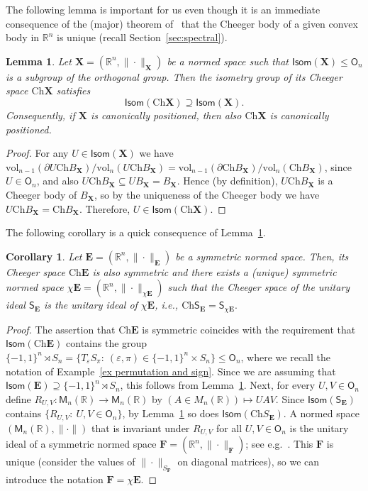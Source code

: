 \documentclass[11pt,reqno]{amsart}
\renewcommand{\le}{\leqslant}
\newcommand{\X}{\mathbf X}
\newcommand{\e}{\varepsilon}
\newcommand{\R}{\mathbb R}
\newtheorem{lemma}[theorem]{Lemma}
\newtheorem{corollary}[theorem]{Corollary}
\theoremstyle{remark}
\newcommand{\M}{\mathsf{M}}
\renewcommand{\supset}{\supseteq}
\newcommand{\sfS}{\mathsf{S}}
\renewcommand{\subset}{\subseteq}
\newcommand{\Ch}{\mathrm{Ch}}
\newcommand{\vol}{\mathrm{vol}}
\renewcommand{\1}{\mathbf 1}
\newcommand{\bfE}{\mathbf{E}}
\newcommand{\bfF}{\mathbf{F}}
\begin{document}
The following lemma is important for us even though it is an immediate consequence of the (major) theorem of~\cite{AC09} that  the Cheeger body of a given convex body in $\R^n$ is unique (recall Section~\ref{sec:spectral}).

\begin{lemma}\label{lem:cheeger uniqueness} Let $\X=(\R^n,\|\cdot\|_\X)$ be a normed space such that $\mathsf{Isom}(\X)\le \mathsf{O}_n$ is a subgroup of the orthogonal group. Then the isometry group of its Cheeger space $\Ch\X$ satisfies
$$
\mathsf{Isom}(\Ch\X)\supset \mathsf{Isom}(\X).
$$
Consequently, if $\X$ is canonically positioned, then also $\Ch\X$ is canonically positioned.
\end{lemma}

\begin{proof} For any $U\in \mathsf{Isom}(\X)$ we have  $\vol_{n-1}(\partial U\Ch B_\X)/\vol_n(U\Ch B_\X)= \vol_{n-1}(\partial \Ch B_\X)/\vol_n(\Ch B_\X)$, since $U\in \mathsf{O}_n$, and also $U\Ch B_\X\subset U B_\X= B_\X$. Hence (by definition), $U\Ch B_\X$ is a Cheeger body of $B_\X$, so by the uniqueness of the Cheeger body we have $U\Ch B_\X=\Ch B_\X$. Therefore, $U\in \mathsf{Isom}(\Ch \X)$.
\end{proof}

The following corollary is a quick consequence of Lemma~\ref{lem:cheeger uniqueness}.

\begin{corollary}\label{cor chi space} Let $\bfE=(\R^n,\|\cdot\|_\bfE)$ be a symmetric normed space. Then, its Cheeger space $\Ch \bfE$ is also symmetric and  there exists a (unique) symmetric normed space $\chi\bfE=(\R^n,\|\cdot\|_{\chi\bfE})$  such that the Cheeger space of the unitary ideal $\sfS_\bfE$ is the unitary ideal of $\chi\bfE$, i.e., $\Ch \sfS_\bfE=\sfS_{\chi \bfE}.$
\end{corollary}

\begin{proof} The assertion that $\Ch \bfE$ is symmetric coincides with the requirement that $\mathsf{Isom}(\Ch \bfE)$ contains the group $\{-1,1\}^n\rtimes S_n=\{T_\e S_\pi:\ (\e,\pi)\in \{-1,1\}^n\times S_n\}\le \mathsf{O}_n$, where we recall the notation of Example~\ref{ex permutation and sign}. Since we are assuming that $\mathsf{Isom}(\bfE)\supseteq \{-1,1\}^n\rtimes S_n$, this follows from Lemma~\ref{lem:cheeger uniqueness}. Next, for every $U,V\in \mathsf{O}_n$ define $R_{U,V}:\M_n(\R)\to \M_n(\R)$ by $(A\in M_n(\R))\mapsto UAV$. Since $\mathsf{Isom}(\sfS_\bfE)$ contains $\{R_{U,V}:\ U,V\in \mathsf{O}_n\}$, by Lemma~\ref{lem:cheeger uniqueness} so does $\mathsf{Isom}(\Ch S_\bfE)$. A normed space $(\M_n(\R),\|\cdot\|)$ that is invariant under $R_{U,V}$ for all $U,V\in \mathsf{O}_n$  is the unitary ideal of a symmetric normed space $\bfF=(\R^n,\|\cdot\|_{\bfF})$; see e.g.~\cite[Theorem~IV.2.1]{Bha97}. This $\bfF$ is unique (consider the values of $\|\cdot\|_{S_\bfF}$ on diagonal matrices), so we can introduce the notation $\bfF=\chi \bfE$.
\end{proof}
\end{document}

